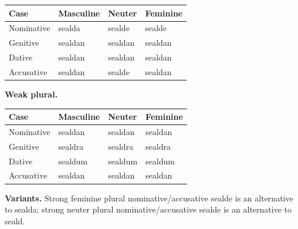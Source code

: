 \par\begingroup
\fontsize{10.5}{13.2}\selectfont
\setlength{\LTleft}{0pt}\setlength{\LTright}{\fill}
\noindent
\begin{tabular}{@{}>{\raggedright\arraybackslash}p{22.0mm}>{\raggedright\arraybackslash}p{31.188mm}>{\raggedright\arraybackslash}p{31.188mm}>{\raggedright\arraybackslash}p{31.188mm}@{}}
\toprule
\textbf{Case} & \textbf{Masculine} & \textbf{Neuter} & \textbf{Feminine} \\
\midrule
Nominative & sealda & sealde & sealde \\
Genitive & sealdan & sealdan & sealdan \\
Dative & sealdan & sealdan & sealdan \\
Accusative & sealdan & sealde & sealdan \\
\bottomrule
\end{tabular}
\par\endgroup
\textbf{Weak plural.}

\par\begingroup
\fontsize{10.5}{13.2}\selectfont
\setlength{\LTleft}{0pt}\setlength{\LTright}{\fill}
\noindent
\begin{tabular}{@{}>{\raggedright\arraybackslash}p{22.0mm}>{\raggedright\arraybackslash}p{31.188mm}>{\raggedright\arraybackslash}p{31.188mm}>{\raggedright\arraybackslash}p{31.188mm}@{}}
\toprule
\textbf{Case} & \textbf{Masculine} & \textbf{Neuter} & \textbf{Feminine} \\
\midrule
Nominative & sealdan & sealdan & sealdan \\
Genitive & sealdra & sealdra & sealdra \\
Dative & sealdum & sealdum & sealdum \\
Accusative & sealdan & sealdan & sealdan \\
\bottomrule
\end{tabular}
\par\endgroup
\textbf{Variants.} Strong feminine plural nominative/\allowbreak{}accusative sealde is an alternative to sealda; strong neuter plural nominative/\allowbreak{}accusative sealde is an alternative to seald.

